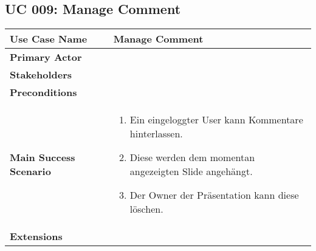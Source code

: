 \subsection{UC 009: Manage Comment}
\label{uc:009-manage-comment}

\begin{tabular}{|l|p{}|}
\hline
\textbf{Use Case Name} 	&	Manage Comment	\\ \hline
\textbf{Primary Actor} 	&		\\ \hline
\textbf{Stakeholders}	&		\\ \hline
\textbf{Preconditions}	&		\\ \hline
\textbf{Main Success Scenario}	&
\begin{enumerate}
	\item Ein eingeloggter User kann Kommentare hinterlassen.
	\item Diese werden dem momentan angezeigten Slide angehängt.
	\item Der Owner der Präsentation kann diese löschen.
\end{enumerate}
\\ \hline
\textbf{Extensions}	& 	\\ \hline
\end{tabular}